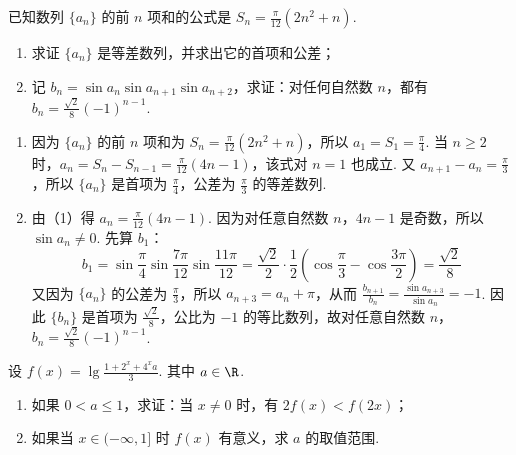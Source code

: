 \begin{problem}
已知数列 \(\{a_n\}\) 的前 \(n\) 项和的公式是 \(S_n=\frac{\pi}{12}(2n^2+n)\).
\begin{enumerate}
\item 求证 \(\{a_n\}\) 是等差数列，并求出它的首项和公差；
\item 记 \(b_n=\sin a_n\sin a_{n+1}\sin a_{n+2}\)，求证：对任何自然数 \(n\)，都有 \(b_n=\frac{\sqrt{2}}{8}(-1)^{n-1}\).
\end{enumerate}
\end{problem}

\begin{solution}
\begin{enumerate}
\item 因为 \(\{a_n\}\) 的前 \(n\) 项和为 \(S_n=\frac{\pi}{12}(2n^2+n)\)，所以 \(a_1=S_1=\frac{\pi}{4}\). 当 \(n\geqslant2\) 时，\(a_n=S_n-S_{n-1}=\frac{\pi}{12}(4n-1)\)，该式对 \(n=1\) 也成立. 又 \(a_{n+1}-a_n=\frac{\pi}{3}\)，所以 \(\{a_n\}\) 是首项为 \(\frac{\pi}{4}\)，公差为 \(\frac{\pi}{3}\) 的等差数列.

\item 由（1）得 \(a_n=\frac{\pi}{12}(4n-1)\). 因为对任意自然数 \(n\)，\(4n-1\) 是奇数，所以 \(\sin a_n\neq0\). 先算 \(b_1\)：
\[
b_1=\sin\frac{\pi}{4}\sin\frac{7\pi}{12}\sin\frac{11\pi}{12}
=\frac{\sqrt{2}}{2}\cdot\frac{1}{2}\left(\cos\frac{\pi}{3}-\cos\frac{3\pi}{2}\right)
=\frac{\sqrt{2}}{8}
\]
又因为 \(\{a_n\}\) 的公差为 \(\frac{\pi}{3}\)，所以 \(a_{n+3}=a_n+\pi\)，从而 \(\displaystyle\frac{b_{n+1}}{b_n}=\frac{\sin a_{n+3}}{\sin a_n}=-1\). 因此 \(\{b_n\}\) 是首项为 \(\frac{\sqrt{2}}{8}\)，公比为 \(-1\) 的等比数列，故对任意自然数 \(n\)，\(\displaystyle b_n=\frac{\sqrt{2}}{8}(-1)^{n-1}\).
\end{enumerate}
\end{solution}

\begin{problem}
设 \(f(x)=\lg\frac{1+2^x+4^xa}{3}\). 其中 \(a\in\R\).
\begin{enumerate}
\item 如果 \(0<a\leqslant1\)，求证：当 \(x\neq0\) 时，有 \(2f(x)<f(2x)\)；
\item 如果当 \(x\in(-\infty,1]\) 时 \(f(x)\) 有意义，求 \(a\) 的取值范围.
\end{enumerate}
\end{problem}

